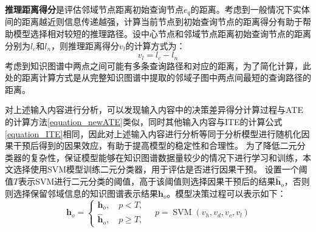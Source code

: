 \documentclass[algorithmlist, AutoFakeBold, AutoFakeSlant, figurelist, tablelist, nomlist, engineering]{seuthesix}
\begin{document}
\textbf{推理距离得分}是评估邻域节点距离初始查询节点$e_q$的距离。考虑到一般情况下实体间的距离越近则信息传递越强，计算当前节点到初始查询节点的距离得分有助于帮助模型选择相对较短的推理路径。设中心节点和邻域节点距离初始查询节点的距离分别为$l_c$和$l_n$，则推理距离得分$v_l$的计算方式为：
\begin{equation}
  v_l = l_c - l_n
  \label{get4}
\end{equation}
考虑到知识图谱中两点之间可能有多条查询路径和对应的距离，为了简化计算，此处的距离计算方式是从完整知识图谱中提取的邻域子图中两点间最短的查询路径的距离。

对上述输入内容进行分析，可以发现输入内容中的决策差异得分计算过程与ATE的计算方法\ref{equation_newATE}类似，同时其他输入内容与ITE的计算公式\ref{equation_ITE}相同，因此对上述输入内容进行分析等同于分析模型进行随机化因果干预后得到的因果效应，有助于提高模型的稳定性和合理性。
为了降低二元分类器的复杂性，保证模型能够在知识图谱数据量较少的情况下进行学习和训练，本文选择使用SVM模型训练二元分类器，用于评估是否进行因果干预。
设置一个阈值$T$表示SVM进行二元分类的阈值，高于该阈值则选择因果干预后的结果$\bm{\hat{h}}_o$，否则则选择保留邻域信息的知识图谱表示结果$\bm{h}_o$。模型决策过程可以表示如下：
\begin{equation}
  \bm{h}_o = \left\{\begin{array}{l}
  \bm{h}_o,\quad p < T, \\
  \bm{\hat{h}}_o,\quad p \geq T,
  \end{array} \quad p = \operatorname{SVM}\left(v_h, v_d, v_c, v_l\right)\right.
  \label{equation_SVM}
\end{equation}
\end{document}
